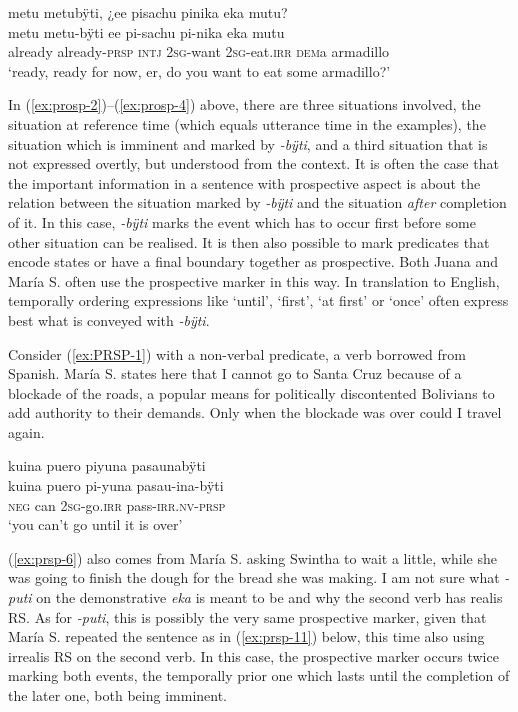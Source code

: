 \ea\label{ex:prosp-4}
\begingl
\glpreamble metu metubÿti, ¿ee pisachu pinika eka mutu?\\
\gla metu metu-bÿti ee pi-sachu pi-nika eka mutu\\
\glb already already-\textsc{prsp} \textsc{intj} 2\textsc{sg}-want 2\textsc{sg}-eat.\textsc{irr} \textsc{dem}a armadillo\\
\glft ‘ready, ready for now, er, do you want to eat some armadillo?’
\endgl
\trailingcitation{[jxx-p120430l-2.638-640]}
\xe
 

In (\ref{ex:prosp-2})–(\ref{ex:prosp-4}) above, there are three situations involved, the situation at reference time (which equals utterance time in the examples), the situation which is imminent and marked by \textit{-bÿti}, and a third situation that is not expressed overtly, but understood from the context. It is often the case that the important information in a sentence with prospective aspect is about the relation between the situation marked by \textit{-bÿti} and the situation \textit{after} completion of it. In this case, \textit{-bÿti} marks the event which has to occur first before some other situation can be realised. It is then also possible to mark predicates that encode states or have a final boundary together as prospective. Both Juana and María S. often use the prospective marker in this way. In translation to English, temporally ordering expressions like ‘until’, ‘first’, ‘at first’ or ‘once’ often express best what is conveyed with \textit{-bÿti}.

Consider (\ref{ex:PRSP-1}) with a non-verbal predicate, a verb borrowed from Spanish. María S. states here that I cannot go to Santa Cruz because of a blockade of the roads, a popular means for politically discontented Bolivians to add authority to their demands. Only when the blockade was over could I travel again.

\ea\label{ex:PRSP-1}
\begingl 
\glpreamble kuina puero piyuna pasaunabÿti\\
\gla kuina puero pi-yuna pasau-ina-bÿti\\ 
\glb \textsc{neg} can 2\textsc{sg}-go.\textsc{irr} pass-\textsc{irr.nv}-\textsc{prsp}\\ 
\glft ‘you can’t go until it is over’
\trailingcitation{[mrx-c120509l.109]}
\xe

(\ref{ex:prsp-6}) also comes from María S. asking Swintha to wait a little, while she was going to finish the dough for the bread she was making. I am not sure what \mbox{\textit{-puti}} on the demonstrative \textit{eka} is meant to be and why the second verb has realis RS. As for \textit{-puti}, this is possibly the very same prospective marker, given that María S. repeated the sentence as in (\ref{ex:prsp-11}) below, this time also using irrealis RS on the second verb. In this case, the prospective marker occurs twice marking both events, the temporally prior one which lasts until the completion of the later one, both being imminent.
\newpage

